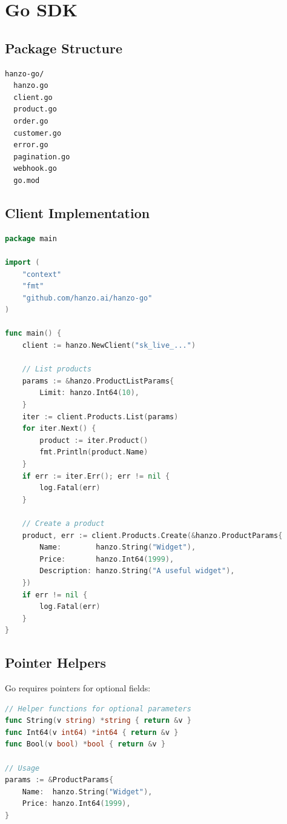 \documentclass[11pt,a4paper]{article}
\begin{document}
\section{Go SDK}

\subsection{Package Structure}

\begin{lstlisting}[caption=Go SDK Structure]
hanzo-go/
  hanzo.go
  client.go
  product.go
  order.go
  customer.go
  error.go
  pagination.go
  webhook.go
  go.mod
\end{lstlisting}

\subsection{Client Implementation}

\begin{lstlisting}[language=Go, caption=Go Client]
package main

import (
    "context"
    "fmt"
    "github.com/hanzo.ai/hanzo-go"
)

func main() {
    client := hanzo.NewClient("sk_live_...")

    // List products
    params := &hanzo.ProductListParams{
        Limit: hanzo.Int64(10),
    }
    iter := client.Products.List(params)
    for iter.Next() {
        product := iter.Product()
        fmt.Println(product.Name)
    }
    if err := iter.Err(); err != nil {
        log.Fatal(err)
    }

    // Create a product
    product, err := client.Products.Create(&hanzo.ProductParams{
        Name:        hanzo.String("Widget"),
        Price:       hanzo.Int64(1999),
        Description: hanzo.String("A useful widget"),
    })
    if err != nil {
        log.Fatal(err)
    }
}
\end{lstlisting}

\subsection{Pointer Helpers}

Go requires pointers for optional fields:

\begin{lstlisting}[language=Go, caption=Go Pointer Helpers]
// Helper functions for optional parameters
func String(v string) *string { return &v }
func Int64(v int64) *int64 { return &v }
func Bool(v bool) *bool { return &v }

// Usage
params := &ProductParams{
    Name:  hanzo.String("Widget"),
    Price: hanzo.Int64(1999),
}
\end{lstlisting}
\end{document}
